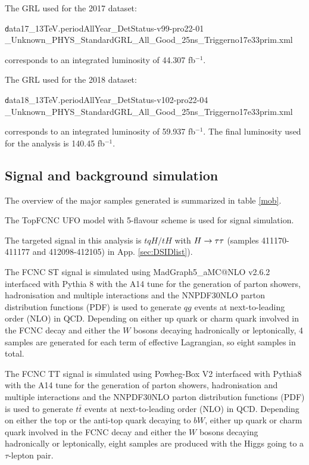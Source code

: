The GRL used for the 2017 dataset:

\begin{centering}
{\texttt data17\_13TeV.periodAllYear\_DetStatus-v99-pro22-01\\\_Unknown\_PHYS\_StandardGRL\_All\_Good\_25ns\_Triggerno17e33prim.xml}

\end{centering}
corresponds to an integrated luminosity of 44.307 fb$^{-1}$.

The GRL used for the 2018 dataset:

\begin{centering}
{\texttt  data18\_13TeV.periodAllYear\_DetStatus-v102-pro22-04\\\_Unknown\_PHYS\_StandardGRL\_All\_Good\_25ns\_Triggerno17e33prim.xml}

\end{centering}
corresponds to an integrated luminosity of 59.937 fb$^{-1}$. The final luminosity used for the analysis is 140.45 fb$^{-1}$.

\subsection{Signal and background simulation}
\label{sec:generator}

The overview of the major samples generated is summarized in table \ref{mob}.

The TopFCNC UFO model \cite{FCNC_UFO1,FCNC_UFO2} with 5-flavour scheme is used for signal simulation.

The targeted signal in this analysis is $tqH/tH$ with $H \rightarrow \tau\tau$ (samples 411170-411177 and 412098-412105) in App. \ref{sec:DSIDlist}).

The FCNC ST signal is simulated using MadGraph5\_aMC@NLO v2.6.2 \cite{MG5} interfaced with Pythia 8 \cite{Pythia8} with the A14 tune \cite{A14} for the generation of parton showers, hadronisation and multiple interactions and the NNPDF30NLO \cite{NNPDF30NLO} parton distribution functions (PDF) is used to generate $qg$ events at next-to-leading order (NLO) in QCD. Depending on either up quark or charm quark involved in the FCNC decay and either the $W$ bosons decaying hadronically or leptonically, 4 samples are generated for each term of effective Lagrangian, so eight samples in total.

The FCNC TT signal is simulated using Powheg-Box \cite{Powheg} V2 interfaced with Pythia8 \cite{Pythia8} with the A14 tune \cite{A14} for the generation of parton showers, hadronisation and multiple interactions and the NNPDF30NLO \cite{NNPDF30NLO} parton distribution functions (PDF) is used to generate $t\bar{t}$ events at next-to-leading order (NLO) in QCD. Depending on either the top or the anti-top quark decaying to $bW$, either up quark or charm quark involved in the FCNC decay and either the $W$ bosons decaying hadronically or leptonically, eight samples are produced with the Higgs going to a $\tau$-lepton pair.

